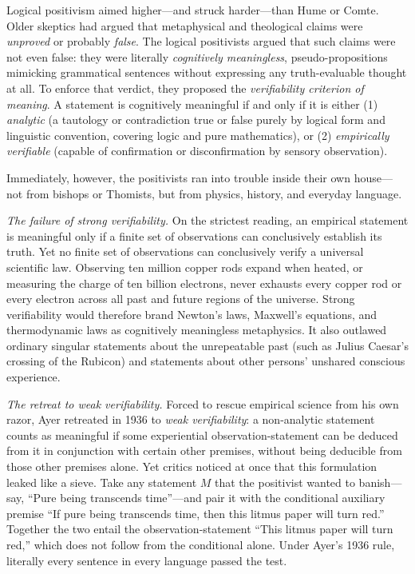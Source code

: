 Logical positivism aimed higher---and struck harder---than Hume or Comte. Older skeptics had argued that metaphysical and theological claims were \emph{unproved} or probably \emph{false}. The logical positivists argued that such claims were not even false: they were literally \emph{cognitively meaningless}, pseudo-propositions mimicking grammatical sentences without expressing any truth-evaluable thought at all. To enforce that verdict, they proposed the \emph{verifiability criterion of meaning}. A statement is cognitively meaningful if and only if it is either (1) \emph{analytic} (a tautology or contradiction true or false purely by logical form and linguistic convention, covering logic and pure mathematics), or (2) \emph{empirically verifiable} (capable of confirmation or disconfirmation by sensory observation).

Immediately, however, the positivists ran into trouble inside their own house---not from bishops or Thomists, but from physics, history, and everyday language.

\emph{The failure of strong verifiability.} On the strictest reading, an empirical statement is meaningful only if a finite set of observations can conclusively establish its truth. Yet no finite set of observations can conclusively verify a universal scientific law. Observing ten million copper rods expand when heated, or measuring the charge of ten billion electrons, never exhausts every copper rod or every electron across all past and future regions of the universe. Strong verifiability would therefore brand Newton's laws, Maxwell's equations, and thermodynamic laws as cognitively meaningless metaphysics. It also outlawed ordinary singular statements about the unrepeatable past (such as Julius Caesar's crossing of the Rubicon) and statements about other persons' unshared conscious experience.

\emph{The retreat to weak verifiability.} Forced to rescue empirical science from his own razor, Ayer retreated in 1936 to \emph{weak verifiability}: a non-analytic statement counts as meaningful if some experiential observation-statement can be deduced from it in conjunction with certain other premises, without being deducible from those other premises alone. Yet critics noticed at once that this formulation leaked like a sieve. Take any statement $M$ that the positivist wanted to banish---say, ``Pure being transcends time''---and pair it with the conditional auxiliary premise ``If pure being transcends time, then this litmus paper will turn red.'' Together the two entail the observation-statement ``This litmus paper will turn red,'' which does not follow from the conditional alone. Under Ayer's 1936 rule, literally every sentence in every language passed the test.

